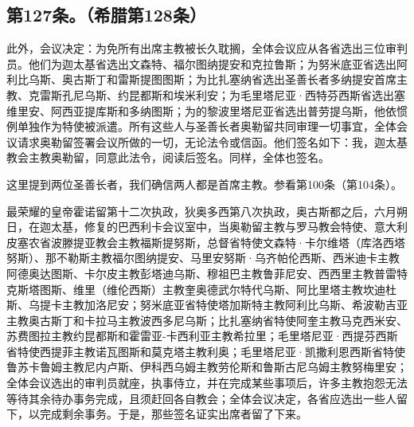 
\subsection{第127条。（希腊第128条）}

\par

此外，会议决定：为免所有出席主教被长久耽搁，全体会议应从各省选出三位审判员。他们为迦太基省选出文森特、福尔图纳提安和克拉鲁斯；为努米底亚省选出阿利比乌斯、奥古斯丁和雷斯提图图斯；为比扎塞纳省选出圣善长者多纳提安首席主教、克雷斯孔尼乌斯、约昆都斯和埃米利安；为毛里塔尼亚·西特芬西斯省选出塞维里安、阿西亚提库斯和多纳图斯；为的黎波里塔尼亚省选出普劳提乌斯，他依惯例单独作为特使被派遣。所有这些人与圣善长者奥勒留共同审理一切事宜，全体会议请求奥勒留签署会议所做的一切，无论法令或信函。他们签名如下：我，迦太基教会主教奥勒留，同意此法令，阅读后签名。同样，全体也签名。\par

这里提到两位圣善长者，我们确信两人都是首席主教。参看第100条（第104条）。\par

\par

最荣耀的皇帝霍诺留第十二次执政，狄奥多西第八次执政，奥古斯都之后，六月朔日，在迦太基，修复的巴西利卡会议室中，当奥勒留主教与罗马教会特使、意大利皮塞农省波滕提亚教会主教福斯提努斯，总督省特使文森特·卡尔维塔（库洛西塔努斯）、那不勒斯主教福尔图纳提安、马里安努斯·乌齐帕伦西斯、西米迪卡主教阿德奥达图斯、卡尔皮主教彭塔迪乌斯、穆祖巴主教鲁菲尼安、西西里主教普雷特克斯塔图斯、维里（维伦西斯）主教奎奥德武尔特代乌斯、阿比里塔主教坎迪杜斯、乌提卡主教加洛尼安；努米底亚省特使塔加斯特主教阿利比乌斯、希波勒吉亚主教奥古斯丁和卡拉马主教波西多尼乌斯；比扎塞纳省特使阿奎主教马克西米安、苏费图拉主教约昆都斯和霍雷亚-卡西利亚主教希拉里；毛里塔尼亚·西提芬西斯省特使西提菲主教诺瓦图斯和莫克塔主教利奥；毛里塔尼亚·凯撒利恩西斯省特使鲁苏卡鲁姆主教尼内卢斯、伊科西乌姆主教劳伦斯和鲁斯古尼乌姆主教努梅里安；全体会议选出的审判员就座，执事侍立，并在完成某些事项后，许多主教抱怨无法等待其余待办事务完成，且须赶回各自教会；全体会议决定，各省应选出一些人留下，以完成剩余事务。于是，那些签名证实出席者留了下来。\par


